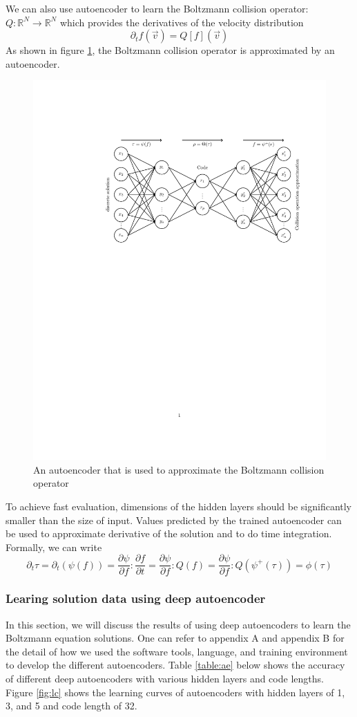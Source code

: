 \documentclass{article}
\begin{document}
We can also use autoencoder to learn the Boltzmann collision operator: $Q:\mathbb{R}^N\rightarrow\mathbb{R}^N$ which provides the derivatives of the velocity distribution
\begin{equation}
\partial_t{f(\vec{v})} = Q[f](\vec{v})
\end{equation}
As shown in figure \ref{fig:ColOpAE}, the Boltzmann collision operator is approximated by an autoencoder.
\begin{figure}[h]
	\centering
	\includegraphics[width=.75\textwidth]{ColOpAE.pdf}
	\caption{An autoencoder that is used to approximate the Boltzmann collision operator}
	\label{fig:ColOpAE}
\end{figure}
\noindent To achieve fast evaluation, dimensions of the hidden layers should be significantly smaller than the size of input. Values predicted by the trained autoencoder can be used to approximate derivative of the solution and to do time integration. Formally, we can write
\begin{equation}
\partial_t{\tau} = \partial_t(\psi(f)) = \frac{\partial\psi}{\partial f}:\frac{\partial f}{\partial t} = \frac{\partial\psi}{\partial f}:Q(f) = \frac{\partial\psi}{\partial f}:Q(\psi^+(\tau)) = \phi(\tau)
\end{equation}

\subsubsection{Learing solution data using deep autoencoder}
In this section, we will discuss the results of using deep autoencoders to learn the Boltzmann equation solutions. One can refer to appendix A and appendix B for the detail of how we used the software tools, language, and training environment to develop the different autoencoders. Table \ref{table:ae} below shows the accuracy of different deep autoencoders with various hidden layers and code lengths. Figure \ref{fig:lc} shows the learning curves of autoencoders with hidden layers of 1, 3, and 5 and code length of 32.
\end{document}
